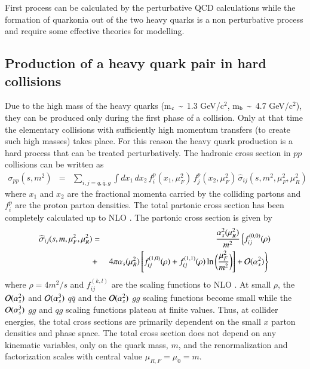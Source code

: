 \documentclass[review]{elsarticle}
\begin{document}
First process can be calculated by the perturbative QCD calculations while the 
formation of quarkonia out of the two heavy quarks is a non perturbative process 
and require some effective theories for modelling. 

\subsection{Production of a heavy quark pair in hard collisions}
\label{subsec:HeavyQuarkProd}
Due to the high mass of the heavy quarks (m$_{\rm c}\,\sim$ 1.3 GeV/c$^2$, m$_{\rm b}\,\sim$ 4.7 GeV/c$^2$), 
they can be produced only during the first phase of a collision.
Only at that time the elementary collisions with sufficiently high momentum 
transfers (to create such high masses) takes place. For this reason the heavy quark production
is a hard process that can be treated perturbatively.
The hadronic cross section in $pp$ collisions can
be written as
\begin{eqnarray}
\sigma_{pp}(s,m^2) & = & \sum_{i,j = q, \overline q, g} 
\int dx_1 \, dx_2 \, 
f_i^p (x_1,\mu_F^2) \,
f_j^p(x_2,\mu_F^2) \, \widehat{\sigma}_{ij}(s,m^2,\mu_F^2,\mu_R^2)
\label{sigpp}
\end{eqnarray}
where $x_1$ and $x_2$ are the fractional momenta carried by the colliding
partons and $f_i^p$ are the proton parton densities.
The total partonic cross section has been completely calculated up to NLO
\cite{Nason:1987xz,Nason:1989zy}. The partonic cross section is given by
\begin{eqnarray}
\widehat{\sigma}_{ij}(s,m,\mu_F^2,\mu_R^2) & = & 
\frac{\alpha_s^2(\mu_R^2)}{m^2}
\left\{ f^{(0,0)}_{ij}(\rho) \right. \nonumber \\
 & + & \left. 4\pi \alpha_s(\mu_R^2) \left[f^{(1,0)}_{ij}(\rho) + 
f^{(1,1)}_{ij}(\rho)\ln\bigg(\frac{\mu_F^2}{m^2} \bigg) \right] 
+ {\cal O}(\alpha_s^2) \right\}
\,\, 
\label{sigpart}
\end{eqnarray}
where $\rho = 4m^2/s$ and 
$f_{ij}^{(k,l)}$ are the scaling functions to NLO \cite{Nason:1987xz,Nason:1989zy}. 
At small $\rho$, the ${\cal O}(\alpha_s^2)$ and ${\cal O}(\alpha_s^3)$
$q \overline q$ and the ${\cal O}(\alpha_s^2)$ $gg$ scaling functions 
become small while the ${\cal O}(\alpha_s^3)$ $gg$ and $qg$ scaling functions
plateau at finite values.  Thus, at collider energies, the total cross sections
are primarily dependent on the small $x$ parton densities and phase space.
The total cross section does not depend on any kinematic variables, 
only on the quark mass, $m$, and the renormalization and factorization scales with central
value $\mu_{R,F} =\mu_0 = m$.
\end{document}
